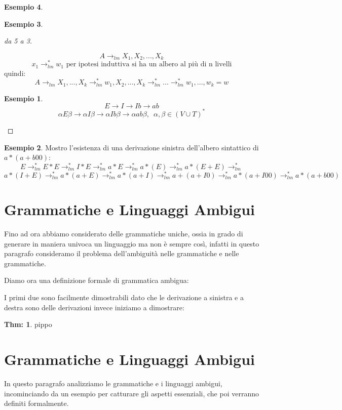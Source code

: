 \documentclass[a4paper]{book}
\theoremstyle{definition}%
\newtheorem{thm}{Thm:}[chapter]
\newtheorem*{esempio}{Esempio}
\begin{document}
\begin{esempio}
\begin{esempio}
\begin{proof}[da 5 a 3]
\begin{itemize}
\begin{center}
\end{center}
$$A\to_{lm} X_1,X_2,...,X_k$$
$$x_1\to^*_{lm}w_1 \mbox{ per ipotesi induttiva si ha un albero al più di n livelli}$$
quindi:
$$A\to_{lm}X_1,...,X_k\to^*_{lm}w_1,X_2,...,X_k\to^*_{lm}...\to^*_{lm}w_1,...,w_k=w$$
\end{itemize}
\begin{esempio}
$$E\to I\to Ib\to ab$$
$$\alpha E\beta\to\alpha I\beta\to \alpha Ib\beta\to \alpha ab\beta,\,\,\,\alpha,\beta\in(V\cup T)^*$$
\end{esempio}
\end{proof}
\begin{esempio}
Mostro l'esistenza di una derivazione sinistra dell'albero sintattico di $a*(a+b00)$:
$$E\to^*_{lm}E*E\to^*_{lm}I*E\to^*_{lm}a*E\to^*_{lm}a*(E)\to^*_{lm}a*(E+E)\to^*_{lm}$$
$$a*(I+E)\to^*_{lm}a*(a+E)\to^*_{lm}a*(a+I)\to^*_{lm}a+(a+I0)\to^*_{lm}a*(a+I00)\to^*_{lm}a*(a+b00)$$
\end{esempio}

\section{Grammatiche e Linguaggi Ambigui}
Fino ad ora abbiamo considerato delle grammatiche uniche, ossia in grado di generare in maniera univoca un linguaggio ma non è sempre così,
infatti in questo paragrafo consideramo il problema dell'ambiguità nelle grammatiche e nelle grammatiche.

Diamo ora una definizione formale di grammatica ambigua:

  I primi due sono facilmente dimostrabili dato che le derivazione a sinistra e a destra sono delle derivazioni invece iniziamo a dimostrare:
  \begin{thm}

    pippo
  \end{thm}


  \section{Grammatiche e Linguaggi Ambigui}
  In questo paragrafo analizziamo le grammatiche e i linguaggi ambigui, incominciando da un esempio per catturare gli aspetti essenziali,
  che poi verranno definiti formalmente.


\end{esempio}
\end{esempio}
\end{document}
